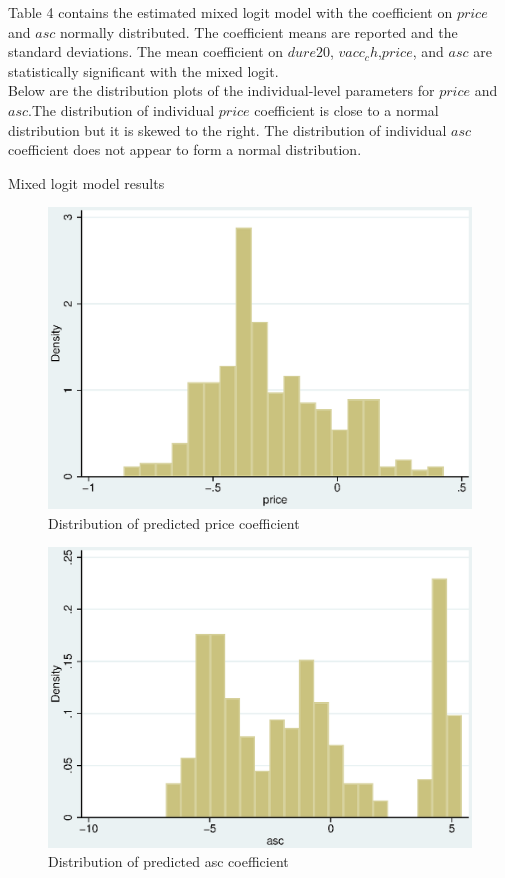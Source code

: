 \documentclass[12pt]{article}
\begin{document}
\begin{enumerate}
Table 4 contains the estimated mixed logit model with the coefficient on $price$ and $asc$ normally distributed. The coefficient means are reported and the standard deviations. The mean coefficient on $dure20$, $vacc_ch$,$price$, and $asc$ are statistically significant with the mixed logit.\\
Below are the distribution plots of the individual-level parameters for $price$ and $asc$.The distribution of individual $price$ coefficient is close to a normal distribution but it is skewed to the right. The distribution of individual $asc$ coefficient does not appear to form a normal distribution.\\

\begin{table}[h]  
\caption{Mixed logit model results}
{\label{tab:mixlogit}}
\small

\end{table}

\begin{figure}[htbp]
\centering
\includegraphics[width=4.9in]{pricegraph.eps}
\caption{Distribution of predicted price coefficient}
\label{price}
\end{figure}

\begin{figure}[htbp]
\centering
\includegraphics[width=4.9in]{ascgraph.eps}
\caption{Distribution of predicted asc coefficient}
\label{price}
\end{figure}


\end{enumerate}
\end{document}
